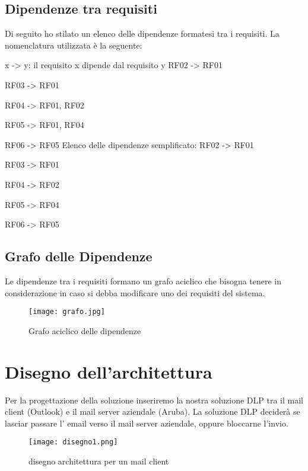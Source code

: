         \subsection{Dipendenze tra requisiti}
        Di seguito ho stilato un elenco delle dipendenze formatesi tra i requisiti.
        La nomenclatura utilizzata è la seguente:
        \begin{flushleft}
          x -> y: il requisito x dipende dal requisito y
          \newline
          \newline
          RF02 -> RF01

          RF03 -> RF01

          RF04 -> RF01, RF02

          RF05 -> RF01, RF04

          RF06 -> RF05
          \newline
          \newline
          Elenco delle dipendenze semplificato: 
          \newline
          \newline
          RF02 -> RF01

          RF03 -> RF01

          RF04 -> RF02

          RF05 -> RF04 
          
          RF06 -> RF05
        \end{flushleft}

        \newpage
        \subsection{Grafo delle Dipendenze}
        Le dipendenze tra i requisiti formano un grafo aciclico che bisogna tenere in considerazione in caso si debba modificare uno dei requisiti del sistema.

        \begin{figure}[htp]
          \centering
          \texttt{[image: grafo.jpg]}
          \caption{Grafo aciclico delle dipendenze}\label{grafoDipendenze}
        \end{figure}

\section{Disegno dell'architettura}

  Per la progettazione della soluzione inseriremo la nostra soluzione DLP
  tra il mail client (Outlook) e il mail server aziendale (Aruba). La soluzione DLP deciderà se lasciar 
  passare l' email verso il mail server aziendale, oppure bloccarne l'invio.
  \begin{figure}[htp]
    \centering
    \texttt{[image: disegno1.png]}
    \caption{disegno architettura per un mail client}\label{disegno1}
  \end{figure}

